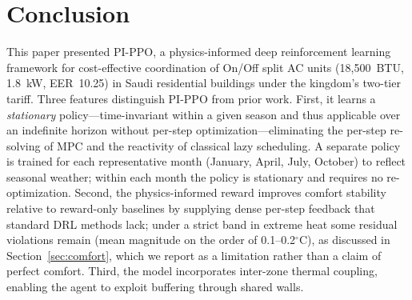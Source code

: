 \documentclass[12pt,a4paper]{article}
\begin{document}
\section{Conclusion}
\label{sec:conclusion}

This paper presented PI-PPO, a physics-informed deep reinforcement learning framework for cost-effective coordination of On/Off split AC units (18{,}500~BTU, 1.8~kW, EER~10.25) in Saudi residential buildings under the kingdom's two-tier tariff. Three features distinguish PI-PPO from prior work. First, it learns a \textit{stationary} policy---time-invariant within a given season and thus applicable over an indefinite horizon without per-step optimization---eliminating the per-step re-solving of MPC and the reactivity of classical lazy scheduling. A separate policy is trained for each representative month (January, April, July, October) to reflect seasonal weather; within each month the policy is stationary and requires no re-optimization. Second, the physics-informed reward improves comfort stability relative to reward-only baselines by supplying dense per-step feedback that standard DRL methods lack; under a strict band in extreme heat some residual violations remain (mean magnitude on the order of 0.1--0.2$^\circ$C), as discussed in Section~\ref{sec:comfort}, which we report as a limitation rather than a claim of perfect comfort. Third, the model incorporates inter-zone thermal coupling, enabling the agent to exploit buffering through shared walls.
\end{document}
